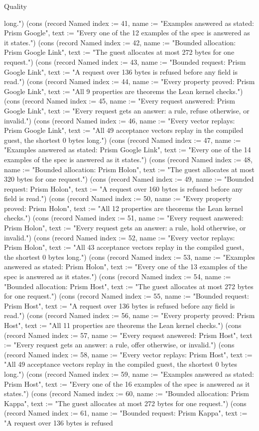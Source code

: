 \begin{lexlean}{Quality}
\begin{semanticmodule}
{long."}) (cons (record Named {index := 41, name := "Examples answered as stated: Prism Google", text := "Every one of the 12 examples of the spec is answered as it states."}) (cons (record Named {index := 42, name := "Bounded allocation: Prism Google Link", text := "The guest allocates at most 272 bytes for one request."}) (cons (record Named {index := 43, name := "Bounded request: Prism Google Link", text := "A request over 136 bytes is refused before any field is read."}) (cons (record Named {index := 44, name := "Every property proved: Prism Google Link", text := "All 9 properties are theorems the Lean kernel checks."}) (cons (record Named {index := 45, name := "Every request answered: Prism Google Link", text := "Every request gets an answer: a rule, refuse otherwise, or invalid."}) (cons (record Named {index := 46, name := "Every vector replays: Prism Google Link", text := "All 49 acceptance vectors replay in the compiled guest, the shortest 0 bytes long."}) (cons (record Named {index := 47, name := "Examples answered as stated: Prism Google Link", text := "Every one of the 14 examples of the spec is answered as it states."}) (cons (record Named {index := 48, name := "Bounded allocation: Prism Holon", text := "The guest allocates at most 320 bytes for one request."}) (cons (record Named {index := 49, name := "Bounded request: Prism Holon", text := "A request over 160 bytes is refused before any field is read."}) (cons (record Named {index := 50, name := "Every property proved: Prism Holon", text := "All 12 properties are theorems the Lean kernel checks."}) (cons (record Named {index := 51, name := "Every request answered: Prism Holon", text := "Every request gets an answer: a rule, hold otherwise, or invalid."}) (cons (record Named {index := 52, name := "Every vector replays: Prism Holon", text := "All 43 acceptance vectors replay in the compiled guest, the shortest 0 bytes long."}) (cons (record Named {index := 53, name := "Examples answered as stated: Prism Holon", text := "Every one of the 13 examples of the spec is answered as it states."}) (cons (record Named {index := 54, name := "Bounded allocation: Prism Host", text := "The guest allocates at most 272 bytes for one request."}) (cons (record Named {index := 55, name := "Bounded request: Prism Host", text := "A request over 136 bytes is refused before any field is read."}) (cons (record Named {index := 56, name := "Every property proved: Prism Host", text := "All 11 properties are theorems the Lean kernel checks."}) (cons (record Named {index := 57, name := "Every request answered: Prism Host", text := "Every request gets an answer: a rule, offer otherwise, or invalid."}) (cons (record Named {index := 58, name := "Every vector replays: Prism Host", text := "All 49 acceptance vectors replay in the compiled guest, the shortest 0 bytes long."}) (cons (record Named {index := 59, name := "Examples answered as stated: Prism Host", text := "Every one of the 16 examples of the spec is answered as it states."}) (cons (record Named {index := 60, name := "Bounded allocation: Prism Kappa", text := "The guest allocates at most 272 bytes for one request."}) (cons (record Named {index := 61, name := "Bounded request: Prism Kappa", text := "A request over 136 bytes is refused }
\end{semanticmodule}
\end{lexlean}
